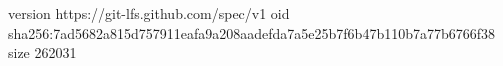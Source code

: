version https://git-lfs.github.com/spec/v1
oid sha256:7ad5682a815d757911eafa9a208aadefda7a5e25b7f6b47b110b7a77b6766f38
size 262031
